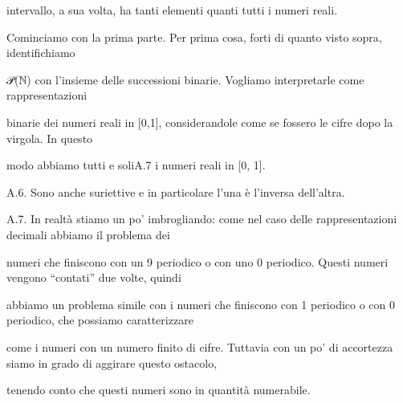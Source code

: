 \documentclass[a4paper,portrait,12pt]{article}
\begin{document}
\begin{flushleft}
intervallo, a sua volta, ha tanti elementi quanti tutti i numeri reali.
\end{flushleft}


\begin{flushleft}
Cominciamo con la prima parte. Per prima cosa, forti di quanto visto sopra, identifichiamo
\end{flushleft}


\begin{flushleft}
𝒫(ℕ) con l'insieme delle successioni binarie. Vogliamo interpretarle come rappresentazioni
\end{flushleft}


\begin{flushleft}
binarie dei numeri reali in [0,1], considerandole come se fossero le cifre dopo la virgola. In questo
\end{flushleft}


\begin{flushleft}
modo abbiamo tutti e soliA.7 i numeri reali in [0, 1].
\end{flushleft}


\begin{flushleft}
A.6. Sono anche suriettive e in particolare l'una \`{e} l'inversa dell'altra.
\end{flushleft}


\begin{flushleft}
A.7. In realt\`{a} stiamo un po' imbrogliando: come nel caso delle rappresentazioni decimali abbiamo il problema dei
\end{flushleft}


\begin{flushleft}
numeri che finiscono con un 9 periodico o con uno 0 periodico. Questi numeri vengono ``contati'' due volte, quindi
\end{flushleft}


\begin{flushleft}
abbiamo un problema simile con i numeri che finiscono con 1 periodico o con 0 periodico, che possiamo caratterizzare
\end{flushleft}


\begin{flushleft}
come i numeri con un numero finito di cifre. Tuttavia con un po' di accortezza siamo in grado di aggirare questo ostacolo,
\end{flushleft}


\begin{flushleft}
tenendo conto che questi numeri sono in quantit\`{a} numerabile.
\end{flushleft}
\end{document}
